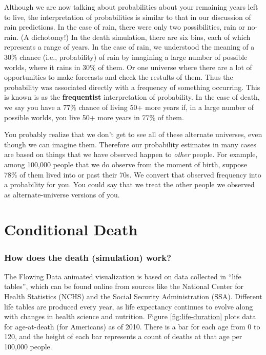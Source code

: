 \documentclass[openany]{book}
\begin{document}
Although we are now talking about probabilities about your remaining years left to live, the interpretation of probabilities is similar to that in our discussion of rain predictions. In the case of rain, there were only two possibilities, rain or no-rain. (A dichotomy!) In the death simulation, there are six bins, each of which represents a range of years. In the case of rain, we understood the meaning of a 30\% chance (i.e., probability) of rain by imagining a large number of possible worlds, where it rains in 30\% of them. Or one universe where there are a lot of opportunities to make forecasts and check the restults of them. Thus the probability was associated directly with a frequency of something occurring. This is known is as the \textbf{frequentist} interpretation of probability. In the case of death, we say you have a 77\% chance of living 50+ more years if, in a large number of possible worlds, you live 50+ more years in 77\% of them.

You probably realize that we don't get to see all of these alternate universes, even though we can imagine them. Therefore our probability estimates in many cases are based on things that we have observed happen to \emph{other} people. For example, among 100,000 people that we do observe from the moment of birth, suppose 78\% of them lived into or past their 70s. We convert that observed frequency into a probability for you. You could say that we treat the other people we observed as alternate-universe versions of you.

\hypertarget{conditional-death}{%
\chapter{Conditional Death}\label{conditional-death}}

\hypertarget{how-does-the-death-simulation-work}{%
\subsection*{How does the death (simulation) work?}\label{how-does-the-death-simulation-work}}

The Flowing Data animated visualization is based on data collected in ``life tables'', which can be found online from sources like the National Center for Health Statistics (NCHS) and the Social Security Administration (SSA). Different life tables are produced every year, as life expectancy continues to evolve along with changes in health science and nutrition. Figure \ref{fig:life-duration} plots data for age-at-death (for Americans) as of 2010. There is a bar for each age from 0 to 120, and the height of each bar represents a count of deaths at that age per 100,000 people.
\end{document}
